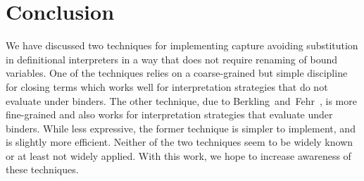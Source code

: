 \section{Conclusion}
\label{sec:conclusion}

We have discussed two techniques for implementing capture avoiding substitution in definitional interpreters in a way that does not require renaming of bound variables.
One of the techniques relies on a coarse-grained but simple discipline for closing terms which works well for interpretation strategies that do not evaluate under binders.
The other technique, due to Berkling~and~Fehr~\cite{berkling1982amodification}, is more fine-grained and also works for interpretation strategies that evaluate under binders.
While less expressive, the former technique is simpler to implement, and is slightly more efficient.
Neither of the two techniques seem to be widely known or at least not widely applied.
With this work, we hope to increase awareness of these techniques.

